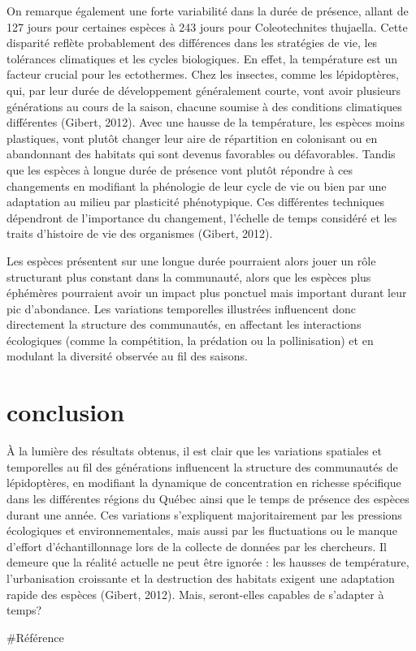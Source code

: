 \documentclass[9pt,twocolumn,twoside,]{pnas-new}
\begin{document}
On remarque également une forte variabilité dans la durée de présence,
allant de 127 jours pour certaines espèces à 243 jours pour
Coleotechnites thujaella. Cette disparité reflète probablement des
différences dans les stratégies de vie, les tolérances climatiques et
les cycles biologiques. En effet, la température est un facteur crucial
pour les ectothermes. Chez les insectes, comme les lépidoptères, qui,
par leur durée de développement généralement courte, vont avoir
plusieurs générations au cours de la saison, chacune soumise à des
conditions climatiques différentes (Gibert, 2012). Avec une hausse de la
température, les espèces moins plastiques, vont plutôt changer leur aire
de répartition en colonisant ou en abandonnant des habitats qui sont
devenus favorables ou défavorables. Tandis que les espèces à longue
durée de présence vont plutôt répondre à ces changements en modifiant la
phénologie de leur cycle de vie ou bien par une adaptation au milieu par
plasticité phénotypique. Ces différentes techniques dépendront de
l'importance du changement, l'échelle de temps considéré et les traits
d'histoire de vie des organismes (Gibert, 2012).

Les espèces présentent sur une longue durée pourraient alors jouer un
rôle structurant plus constant dans la communauté, alors que les espèces
plus éphémères pourraient avoir un impact plus ponctuel mais important
durant leur pic d'abondance. Les variations temporelles illustrées
influencent donc directement la structure des communautés, en affectant
les interactions écologiques (comme la compétition, la prédation ou la
pollinisation) et en modulant la diversité observée au fil des saisons.

\section*{conclusion}\label{conclusion}

À la lumière des résultats obtenus, il est clair que les variations
spatiales et temporelles au fil des générations influencent la structure
des communautés de lépidoptères, en modifiant la dynamique de
concentration en richesse spécifique dans les différentes régions du
Québec ainsi que le temps de présence des espèces durant une année. Ces
variations s'expliquent majoritairement par les pressions écologiques et
environnementales, mais aussi par les fluctuations ou le manque d'effort
d'échantillonnage lors de la collecte de données par les chercheurs. Il
demeure que la réalité actuelle ne peut être ignorée : les hausses de
température, l'urbanisation croissante et la destruction des habitats
exigent une adaptation rapide des espèces (Gibert, 2012). Mais,
seront-elles capables de s'adapter à temps?

\#Référence



% 
\end{document}
